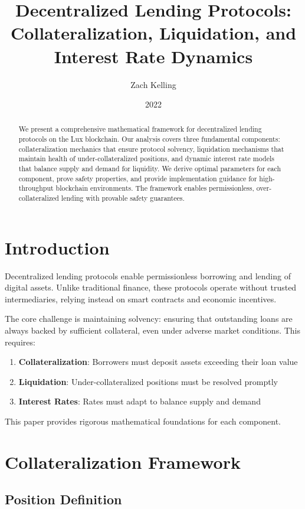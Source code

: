 \documentclass[11pt,a4paper]{article}
\title{Decentralized Lending Protocols: \\
Collateralization, Liquidation, and Interest Rate Dynamics}
\author{Zach Kelling}
\affil{Hanzo Industries \\ Lux Industries \\ Zoo Labs Foundation}
\date{2022}
\theoremstyle{definition}
\begin{document}
\maketitle

\begin{abstract}
We present a comprehensive mathematical framework for decentralized lending protocols on the Lux blockchain. Our analysis covers three fundamental components: collateralization mechanics that ensure protocol solvency, liquidation mechanisms that maintain health of under-collateralized positions, and dynamic interest rate models that balance supply and demand for liquidity. We derive optimal parameters for each component, prove safety properties, and provide implementation guidance for high-throughput blockchain environments. The framework enables permissionless, over-collateralized lending with provable safety guarantees.
\end{abstract}

\section{Introduction}

Decentralized lending protocols enable permissionless borrowing and lending of digital assets. Unlike traditional finance, these protocols operate without trusted intermediaries, relying instead on smart contracts and economic incentives.

The core challenge is maintaining solvency: ensuring that outstanding loans are always backed by sufficient collateral, even under adverse market conditions. This requires:

\begin{enumerate}
\item \textbf{Collateralization}: Borrowers must deposit assets exceeding their loan value
\item \textbf{Liquidation}: Under-collateralized positions must be resolved promptly
\item \textbf{Interest Rates}: Rates must adapt to balance supply and demand
\end{enumerate}

This paper provides rigorous mathematical foundations for each component.

\section{Collateralization Framework}

\subsection{Position Definition}
\end{document}
